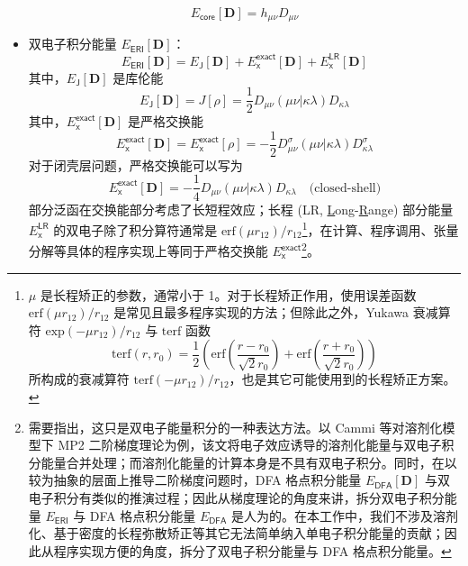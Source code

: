 \begin{itemize}[nosep]
\begin{equation}
          E_\textsf{core} [\mathbf{D}] = h_{\mu \nu} D_{\mu \nu}
        \end{equation}
  \item 双电子积分能量 $E_\textsf{ERI} [\mathbf{D}]$：
        \begin{equation}
          E_\textsf{ERI} [\mathbf{D}] = E_\textsf{J} [\mathbf{D}] + E_\textsf{x}^\textsf{exact} [\mathbf{D}] + E_\textsf{x}^\textsf{LR} [\mathbf{D}]
        \end{equation}
        其中，$E_\textsf{J} [\mathbf{D}]$ 是库伦能
        \begin{equation}
          E_\textsf{J} [\mathbf{D}] = J[\rho] = \frac{1}{2} D_{\mu \nu} (\mu \nu | \kappa \lambda) D_{\kappa \lambda}
        \end{equation}
        其中，$E_\textsf{x}^\textsf{exact} [\mathbf{D}]$ 是严格交换能
        \begin{equation}
          E_\textsf{x}^\textsf{exact} [\mathbf{D}] = E_\textsf{x}^\textsf{exact} [\rho] = - \frac{1}{2} D_{\mu \nu}^\sigma (\mu \nu | \kappa \lambda) D_{\kappa \lambda}^\sigma
        \end{equation}
        对于闭壳层问题，严格交换能可以写为
        \begin{equation}
          E_\textsf{x}^\textsf{exact} [\mathbf{D}] = - \frac{1}{4} D_{\mu \nu} (\mu \nu | \kappa \lambda) D_{\kappa \lambda} \quad \text{(closed-shell)}
        \end{equation}
        部分泛函在交换能部分考虑了长短程效应；长程 (LR, \underline{L}ong-\underline{R}ange) 部分能量 $E_\textsf{x}^\textsf{LR}$ 的双电子除了积分算符通常是 $\mathrm{erf} (\mu r_{12}) / r_{12}$\footnote{$\mu$ 是长程矫正的参数，通常小于 1。对于长程矫正作用，使用误差函数 $\mathrm{erf} (\mu r_{12}) / r_{12}$ 是常见且最多程序实现的方法；但除此之外，Yukawa 衰减算符 $\mathrm{exp} (-\mu r_{12}) / r_{12}$\cite{Savin-Flad.IJQC.1995} 与 $\mathrm{terf}$ 函数 $$\mathrm{terf} (r, r_0) = \frac{1}{2} \left( \mathrm{erf} \left(\frac{r - r_0}{\sqrt{2} r_0}\right) + \mathrm{erf} \left(\frac{r + r_0}{\sqrt{2} r_0}\right) \right)$$ 所构成的衰减算符 $\mathrm{terf} (-\mu r_{12}) / r_{12}$\cite{Goldey-Head-Gordon.PCCP.2013}，也是其它可能使用到的长程矫正方案。}，在计算、程序调用、张量分解等具体的程序实现上等同于严格交换能 $E_\textsf{x}^\textsf{exact}$\footnote{需要指出，这只是双电子能量积分的一种表达方法。以 Cammi 等\cite{Cammi-Frisch.TCA.2004}对溶剂化模型下 MP2 二阶梯度理论为例，该文将电子效应诱导的溶剂化能量与双电子积分能量合并处理；而溶剂化能量的计算本身是不具有双电子积分。同时，在以较为抽象的层面上推导二阶梯度问题时，DFA 格点积分能量 $E_\textsf{DFA} [\mathbf{D}]$ 与双电子积分有类似的推演过程；因此从梯度理论的角度来讲，拆分双电子积分能量 $E_\textsf{ERI}$ 与 DFA 格点积分能量 $E_\textsf{DFA}$ 是人为的。在本工作中，我们不涉及溶剂化、基于密度的长程弥散矫正等其它无法简单纳入单电子积分能量的贡献；因此从程序实现方便的角度，拆分了双电子积分能量与 DFA 格点积分能量。}。

\end{itemize}
